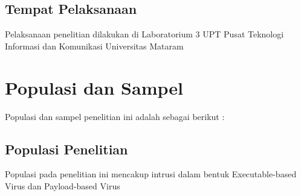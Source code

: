 \documentclass[./skripsi.tex]{subfiles}
\begin{document}
\subsection{Tempat Pelaksanaan}
\par Pelaksanaan penelitian dilakukan di Laboratorium 3 UPT Pusat Teknologi Informasi dan Komunikasi Universitas Mataram
\section{Populasi dan Sampel}
\par Populasi dan sampel penelitian ini adalah sebagai berikut :
\subsection{Populasi Penelitian}
\par Populasi pada penelitian ini mencakup intrusi dalam bentuk Executable-based Virus dan Payload-based Virus
\end{document}
